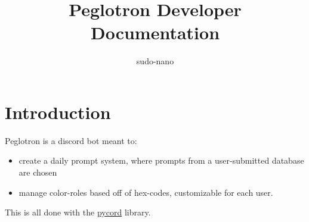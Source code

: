 \documentclass{article}
\title{Peglotron Developer Documentation}
\author{sudo-nano}
\begin{document}
\maketitle

\tableofcontents

\section{Introduction}
Peglotron is a discord bot meant to: 

\begin{itemize}
	\item create a daily prompt system, where prompts from a user-submitted database are chosen
	\item manage color-roles based off of hex-codes, customizable for each user. 
\end{itemize}

This is all done with the \href{https://guide.pycord.dev/}{pycord} library. 
\end{document}
